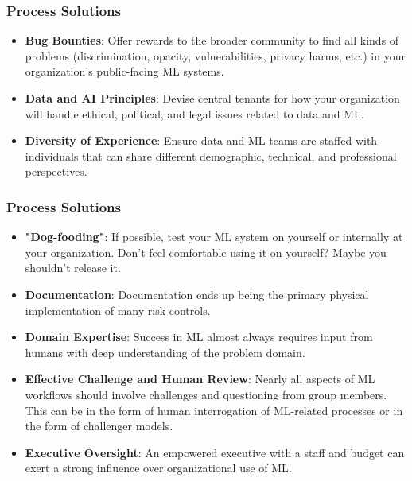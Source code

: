 \documentclass[11pt,
               aspectratio=169,
               hyperref={colorlinks}
               ]{beamer}
\begin{document}
		\begin{frame}
	
			\frametitle{Process Solutions}
			
			\begin{itemize}
				
				\item \textbf{Bug Bounties}: Offer rewards to the broader community to find all kinds of problems (discrimination, opacity, vulnerabilities, privacy harms, etc.) in your organization's public-facing ML systems. 
				
				\item \textbf{Data and AI Principles}: Devise central tenants for how your organization will handle ethical, political, and legal issues related to data and ML.
				
				\item \textbf{Diversity of Experience}: Ensure data and ML teams are staffed with individuals that can share different demographic, technical, and professional perspectives. 
				
			\end{itemize}
					
		\end{frame}
		
		\begin{frame}
		
			\frametitle{Process Solutions}
			
			\begin{itemize}
				
				\item \textbf{"Dog-fooding"}: If possible, test your ML system on yourself or internally at your organization. Don't feel comfortable using it on yourself? Maybe you shouldn't release it. 

				\item \textbf{Documentation}: Documentation ends up being the primary physical implementation of many risk controls. 

				\item \textbf{Domain Expertise}: Success in ML almost always requires input from humans with deep understanding of the problem domain. 
				
				\item \textbf{Effective Challenge and Human Review}: Nearly all aspects of ML workflows should involve challenges and questioning from group members. This can be in the form of human interrogation of ML-related processes or in the form of challenger models. 
				
				\item \textbf{Executive Oversight}: An empowered executive with a staff and budget can exert a strong influence over organizational use of ML.
				
			\end{itemize}
			
		\end{frame}
		
\end{document}
